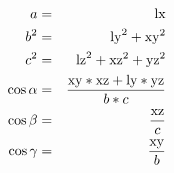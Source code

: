 \documentclass[24pt]{article}
\begin{document}
\begin{eqnarray*}
a &=& {\rm lx} \\
b^2 &=&  {\rm ly}^2 +  {\rm xy}^2 \\
c^2 &=&  {\rm lz}^2 +  {\rm xz}^2 +  {\rm yz}^2 \\
\cos{\alpha} &=& \frac{ {\rm xy}*{ \rm xz} + {\rm ly}*{\rm yz}}{ b*c} \\
\cos{\beta} &=& \frac{\rm xz}{c} \\
\cos{\gamma} &=& \frac{ \rm xy}{b} \\
\end{eqnarray*}
\end{document}

